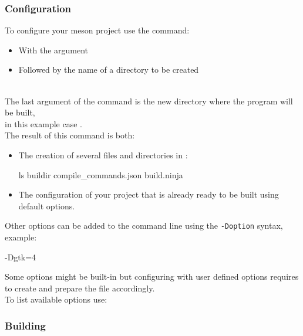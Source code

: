 \subsubsection*{Configuration}
\label{mesonconfigure}

To configure your meson project use the  command: 
\begin{itemize}
\item With the  argument
\item Followed by the name of a directory to be created
\end{itemize}
\vspace{-1cm}
\begin{script}
   
\end{script}
\\[-0.5cm]
\noindent The last argument of the command is the new directory where the program will be built, \\
in this example case . \\
The result of this command is both: 
\begin{itemize}
\item The creation of several files and directories in :
\begin{scripti}
 ls buildir
      compile\_commands.json  
build.ninja               
\end{scripti}
\item The configuration of your project that is already ready to be built using default options.
\end{itemize}
Other options can be added to the command line using the \texttt{-Doption} syntax, example:
\begin{script}
    -Dgtk=4
\end{script}
\noindent Some options might be built-in but configuring with user defined options requires to create and prepare the file  accordingly. \\
To list available options use: 
\begin{script}
   
\end{script}

\subsubsection*{Building}

